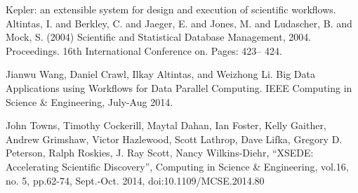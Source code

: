 \begin{thebibliography}{9}
Kepler: an extensible system for design and execution of scientific workflows. Altintas, I. and Berkley, C. and Jaeger, E. and Jones, M. and Ludascher, B. and Mock, S. (2004) Scientific and Statistical Database Management, 2004. Proceedings. 16th International Conference on. Pages: 423-- 424.
 
Jianwu Wang, Daniel Crawl, Ilkay Altintas, and Weizhong Li. Big Data Applications using Workflows for Data Parallel Computing. IEEE Computing in Science \& Engineering, July-Aug 2014.

John Towns, Timothy Cockerill, Maytal Dahan, Ian Foster, Kelly Gaither, Andrew Grimshaw, Victor Hazlewood, Scott Lathrop, Dave Lifka, Gregory D. Peterson, Ralph Roskies, J. Ray Scott, Nancy Wilkins-Diehr, ``XSEDE: Accelerating Scientific Discovery'', Computing in Science \& Engineering, vol.16, no. 5, pp.62-74, Sept.-Oct. 2014, doi:10.1109/MCSE.2014.80
\end{thebibliography}